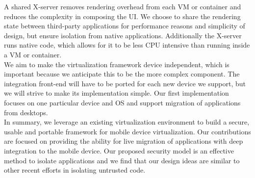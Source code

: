 A shared X-server removes rendering overhead from each VM or container and reduces the complexity in composing the UI. We choose to share the rendering state between third-party applications for performance reasons and simplicity of design, but ensure isolation from native applications. Additionally the X-server runs native code, which allows for it to be less CPU intensive than running inside a VM or container. \\

We aim to make the virtualization framework device independent, which is important because we anticipate this to be the more complex component. The integration front-end will have to be ported for each new device we support, but we will strive to make its implementation simple. Our first implementation focuses on one particular device and OS and support  migration of applications from desktops. \\

In summary, we leverage an existing virtualization environment to build a secure, usable and portable framework for mobile device virtualization. Our contributions are focused on providing the ability for live migration of applications with deep integration to the mobile device. Our proposed security model is an effective method to isolate applications and we find that our design ideas are similar to other recent efforts \cite{grier2008secure} in isolating untrusted code.


